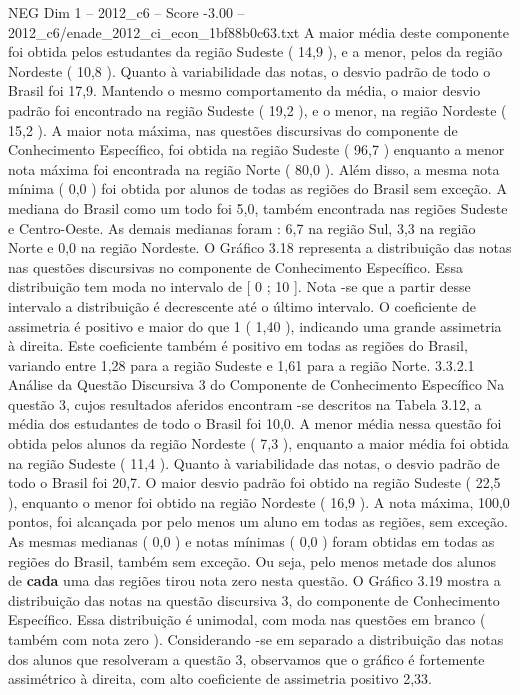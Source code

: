 \begin{textsample}{NEG Dim 1 – 2012\_c6 – Score -3.00 – 2012\_c6/enade\_2012\_ci\_econ\_1bf88b0c63.txt}
A maior média deste componente foi obtida pelos estudantes da região Sudeste ( 14,9 ), e a menor, pelos da região Nordeste ( 10,8 ).
Quanto à variabilidade das notas, o desvio padrão de todo o Brasil foi 17,9.
Mantendo o mesmo comportamento da média, o maior desvio padrão foi encontrado na região Sudeste ( 19,2 ), e o menor, na região Nordeste ( 15,2 ).
A maior nota máxima, nas questões discursivas do componente de Conhecimento Específico, foi obtida na região Sudeste ( 96,7 ) enquanto a menor nota máxima foi encontrada na região Norte ( 80,0 ).
Além disso, a mesma nota mínima ( 0,0 ) foi obtida por alunos de todas as regiões do Brasil sem exceção.
A mediana do Brasil como um todo foi 5,0, também encontrada nas regiões Sudeste e Centro-Oeste.
As demais medianas foram : 6,7 na região Sul, 3,3 na região Norte e 0,0 na região Nordeste.
O Gráfico 3.18 representa a distribuição das notas nas questões discursivas no componente de Conhecimento Específico.
Essa distribuição tem moda no intervalo de [ 0 ; 10 ].
Nota -se que a partir desse intervalo a distribuição é decrescente até o último intervalo.
O coeficiente de assimetria é positivo e maior do que 1 ( 1,40 ), indicando uma grande assimetria à direita.
Este coeficiente também é positivo em todas as regiões do Brasil, variando entre 1,28 para a região Sudeste e 1,61 para a região Norte. 3.3.2.1 Análise da Questão Discursiva 3 do Componente de Conhecimento Específico Na questão 3, cujos resultados aferidos encontram -se descritos na Tabela 3.12, a média dos estudantes de todo o Brasil foi 10,0.
A menor média nessa questão foi obtida pelos alunos da região Nordeste ( 7,3 ), enquanto a maior média foi obtida na região Sudeste ( 11,4 ).
Quanto à variabilidade das notas, o desvio padrão de todo o Brasil foi 20,7.
O maior desvio padrão foi obtido na região Sudeste ( 22,5 ), enquanto o menor foi obtido na região Nordeste ( 16,9 ).
A nota máxima, 100,0 pontos, foi alcançada por pelo menos um aluno em todas as regiões, sem exceção.
As mesmas medianas ( 0,0 ) e notas mínimas ( 0,0 ) foram obtidas em todas as regiões do Brasil, também sem exceção.
Ou seja, pelo menos metade dos alunos de \textbf{cada} uma das regiões tirou nota zero nesta questão.
O Gráfico 3.19 mostra a distribuição das notas na questão discursiva 3, do componente de Conhecimento Específico.
Essa distribuição é unimodal, com moda nas questões em branco ( também com nota zero ).
Considerando -se em separado a distribuição das notas dos alunos que resolveram a questão 3, observamos que o gráfico é fortemente assimétrico à direita, com alto coeficiente de assimetria positivo 2,33.

\end{textsample}
